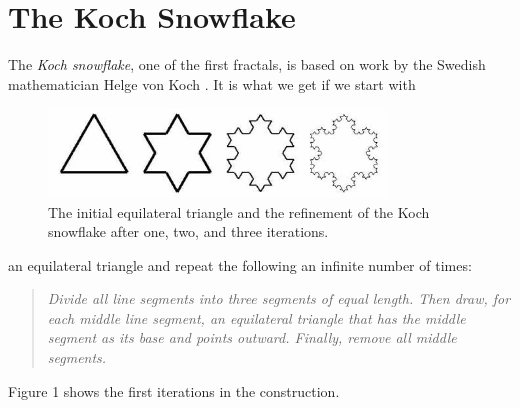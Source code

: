 \documentclass[12pt, a4paper]{article}
\begin{document}
%
\section{The Koch Snowflake}
The \emph{Koch snowflake}, one of the first fractals, is based on work by the
Swedish mathematician Helge von Koch \cite{aoeu}. It is what we get if we
start with 
\begin{figure}[h]
	\label{kalas}
	\centering
	\includegraphics[width=9cm]{snowflake.jpg}
	\caption{The initial equilateral triangle and the refinement of the Koch
		snowflake after one, two, and three iterations.}
\end{figure}
an equilateral triangle and repeat the following an infinite number 
of times:
\begin{quote}
\emph{Divide all line segments into three segments of equal length. Then draw,
	for each middle line segment, an equilateral triangle that has the middle
	segment as its base and points outward. Finally, remove all middle segments.
	}
\end{quote}
Figure 1 shows the first iterations in the construction. 
%
%
\end{document}
